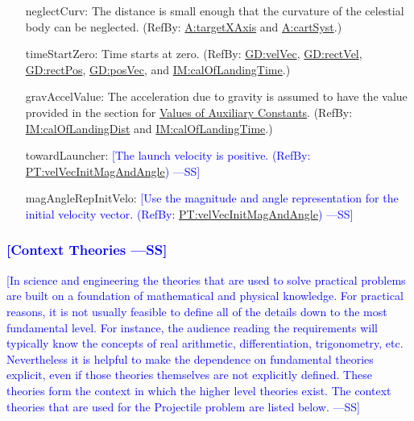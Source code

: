 \documentclass[12pt]{article}
\newcommand{\authornote}[3]{\textcolor{#1}{[#3 ---#2]}}
\newcommand{\authornote}[3]{}
\newcommand{\wss}[1]{\authornote{blue}{SS}{#1}}
\begin{document}
\begin{itemize}
\item[neglectCurv:\phantomsection\label{neglectCurv}]{The distance is small enough that the curvature of the celestial body can be neglected. (RefBy: \hyperref[targetXAxis]{A:targetXAxis} and \hyperref[cartSyst]{A:cartSyst}.)}
\item[timeStartZero:\phantomsection\label{timeStartZero}]{Time starts at zero. (RefBy: \hyperref[GD:velVec]{GD:velVec}, \hyperref[GD:rectVel]{GD:rectVel}, \hyperref[GD:rectPos]{GD:rectPos}, \hyperref[GD:posVec]{GD:posVec}, and \hyperref[IM:calOfLandingTime]{IM:calOfLandingTime}.)}
\item[gravAccelValue:\phantomsection\label{gravAccelValue}]{The acceleration due to gravity is assumed to have the value provided in the section for \hyperref[Sec:AuxConstants]{Values of Auxiliary Constants}. (RefBy: \hyperref[IM:calOfLandingDist]{IM:calOfLandingDist} and \hyperref[IM:calOfLandingTime]{IM:calOfLandingTime}.)}
\item[towardLauncher:\phantomsection\label{towardLauncher}]\wss{The launch velocity is positive. (RefBy: \hyperref[PT:velVecInitMagAndAngle]{PT:velVecInitMagAndAngle})}
\item[magAngleRepInitVelo:\phantomsection\label{magAngleRepInitVelo}]\wss{Use the magnitude and angle representation for the initial velocity vector. (RefBy: \hyperref[PT:velVecInitMagAndAngle]{PT:velVecInitMagAndAngle})}

\end{itemize}

\subsubsection{\wss{Context Theories}}

\wss{In science and engineering the theories that are used to solve practical
problems are built on a foundation of mathematical and physical knowledge. For
practical reasons, it is not usually feasible to define all of the details down
to the most fundamental level. For instance, the audience reading the
requirements will typically know the concepts of real arithmetic,
differentiation, trigonometry, etc.  Nevertheless it is helpful to make the
dependence on fundamental theories explicit, even if those theories themselves
are not explicitly defined. These theories form the context in which the higher
level theories exist.  The context theories that are used for the Projectile
problem are listed below.}
\end{document}
